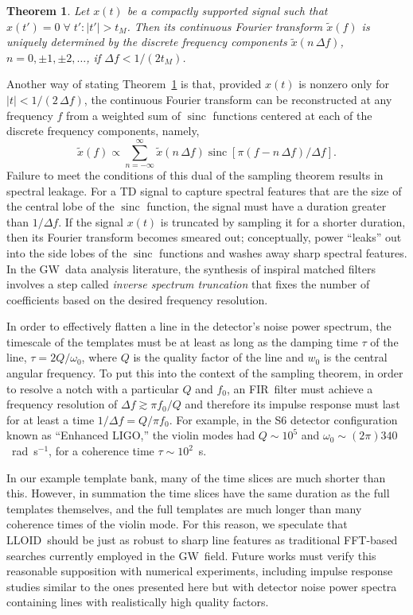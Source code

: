 \documentclass[preprint2]{aastex}
\newtheorem{thm}{Theorem}
\newcommand{\GW}{GW}%
\newcommand{\fir}{FIR}%
\newcommand{\fft}{FFT}%
\newcommand{\lloid}{LLOID}%
\DeclareMathOperator{\sinc}{sinc}
\begin{document}
\begin{thm}
	\label{thm:nyquist-dual}
	Let $x(t)$ be a compactly supported signal such that $x(t') = 0 \; \forall \; t' : |t'| > t_M$.  Then its continuous Fourier transform $\tilde{x}(f)$ is uniquely determined by the discrete frequency components $\tilde{x}(n \, \Delta f)$, $n = 0, \pm 1, \pm 2, \dots$, if $\Delta f < 1 / (2 t_M)$.
\end{thm}

Another way of stating Theorem~\ref{thm:nyquist-dual} is that, provided $x(t)$ is nonzero only for $|t| < 1 / (2 \, \Delta f)$, the continuous Fourier transform can be reconstructed at any frequency $f$ from a weighted sum of $\sinc$ functions centered at each of the discrete frequency components, namely,
$$
	\tilde{x}(f) \propto \sum_{n=-\infty}^{\infty} \tilde{x}\left(n \, \Delta f\right) \sinc \left[ \pi (f - n \, \Delta f) / \Delta f \right].
$$
Failure to meet the conditions of this dual of the sampling theorem results in spectral leakage.  For a TD signal to capture spectral features that are the size of the central lobe of the $\sinc$ function, the signal must have a duration greater than $1/\Delta f$.  If the signal $x(t)$ is truncated by sampling it for a shorter duration, then its Fourier transform becomes smeared out; conceptually, power ``leaks'' out into the side lobes of the $\sinc$ functions and washes away sharp spectral features.  In the \GW\ data analysis literature, the synthesis of inspiral matched filters involves a step called \emph{inverse spectrum truncation} \citep[see][Section VII]{findchirppaper} that fixes the number of coefficients based on the desired frequency resolution.

In order to effectively flatten a line in the detector's noise power
spectrum, the timescale of the templates must be at least as long as
the damping time $\tau$ of the line, $\tau = 2 Q / \omega_0$, where $Q$ is the quality
factor of the line and $w_0$ is the central angular frequency.  To put this into the context of the sampling theorem, in order to resolve a notch with a particular $Q$ and $f_0$, an \fir\ filter must achieve a frequency resolution of $\Delta f \gtrsim \pi f_0 / Q$ and therefore its impulse response must last for at least a time $1/\Delta f = Q / \pi f_0$.  For example,
in the S6 detector configuration known as ``Enhanced LIGO,'' the violin modes \citep{ELIGOSusp} had $Q \sim 10^5$ and $\omega_0 \sim (2 \pi) 340$~rad~s$^{-1}$, for a coherence time $\tau \sim 10^2$~s.

In our example template bank, many of the time slices are much shorter
than this.  However, in summation the time slices have the same duration as the full templates themselves, and the full templates are much longer than many
coherence times of the violin mode.  For this reason, we speculate that 
\lloid\ should be just as robust to sharp line features as
traditional \fft-based searches currently employed in the \GW\ field.  Future works must verify this reasonable supposition with numerical experiments, including impulse response studies similar to the ones presented here but with detector noise power spectra containing lines with realistically high quality factors.
\end{document}

